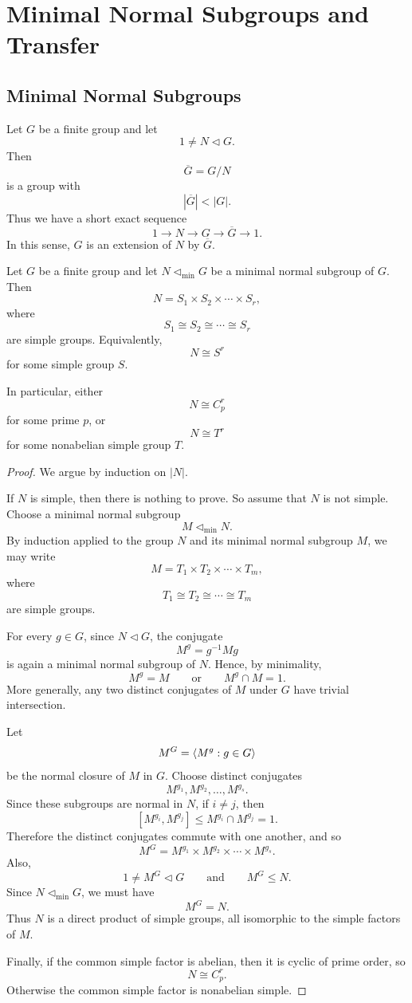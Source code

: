 \chapter{Minimal Normal Subgroups and Transfer}

\section{Minimal Normal Subgroups}

Let $G$ be a finite group and let
\[
    1\neq N\lhd G.
\]
Then
\[
    \overline{G}=G/N
\]
is a group with
\[
    |\overline{G}|<|G|.
\]
Thus we have a short exact sequence
\[
    1\longrightarrow N\longrightarrow G\longrightarrow \overline{G}\longrightarrow 1.
\]
In this sense, $G$ is an extension of $N$ by $\overline{G}$.

\begin{lemma}
Let $G$ be a finite group and let $N\lhd_{\mathrm{min}}G$ be a minimal normal subgroup of $G$. Then
\[
    N=S_1\times S_2\times\cdots\times S_r,
\]
where
\[
    S_1\cong S_2\cong\cdots\cong S_r
\]
are simple groups. Equivalently,
\[
    N\cong S^r
\]
for some simple group $S$.

In particular, either
\[
    N\cong C_p^r
\]
for some prime $p$, or
\[
    N\cong T^r
\]
for some nonabelian simple group $T$.
\end{lemma}

\begin{proof}
We argue by induction on $|N|$.

If $N$ is simple, then there is nothing to prove. So assume that $N$ is not simple. Choose a minimal normal subgroup
\[
    M\lhd_{\mathrm{min}}N.
\]
By induction applied to the group $N$ and its minimal normal subgroup $M$, we may write
\[
    M=T_1\times T_2\times\cdots\times T_m,
\]
where
\[
    T_1\cong T_2\cong\cdots\cong T_m
\]
are simple groups.

For every $g\in G$, since $N\lhd G$, the conjugate
\[
    M^g=g^{-1}Mg
\]
is again a minimal normal subgroup of $N$. Hence, by minimality,
\[
    M^g=M
    \qquad\text{or}\qquad
    M^g\cap M=1.
\]
More generally, any two distinct conjugates of $M$ under $G$ have trivial intersection.

Let
\[
    M^G=\langle M^g:g\in G\rangle
\]
be the normal closure of $M$ in $G$. Choose distinct conjugates
\[
    M^{g_1},M^{g_2},\ldots,M^{g_s}.
\]
Since these subgroups are normal in $N$, if $i\neq j$, then
\[
    [M^{g_i},M^{g_j}]
    \leq M^{g_i}\cap M^{g_j}
    =1.
\]
Therefore the distinct conjugates commute with one another, and so
\[
    M^G=M^{g_1}\times M^{g_2}\times\cdots\times M^{g_s}.
\]
Also,
\[
    1\neq M^G\lhd G
    \qquad\text{and}\qquad
    M^G\leq N.
\]
Since $N\lhd_{\mathrm{min}}G$, we must have
\[
    M^G=N.
\]
Thus $N$ is a direct product of simple groups, all isomorphic to the simple factors of $M$.

Finally, if the common simple factor is abelian, then it is cyclic of prime order, so
\[
    N\cong C_p^r.
\]
Otherwise the common simple factor is nonabelian simple.
\end{proof}

